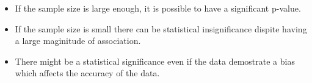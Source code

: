 \documentclass[12pt]{article}
\begin{document}
\begin{enumerate}

\begin{itemize}
    \item If the sample size is large enough, it is possible to have a significant p-value.
    \item If the sample size is small there can be statistical insignificance dispite having a large maginitude of association.
    \item There might be a statistical significance even if the data demostrate a bias which affects the accuracy of the data. 
\end{itemize}

\end{enumerate}



\begin{enumerate}




\end{enumerate}
\end{document}

